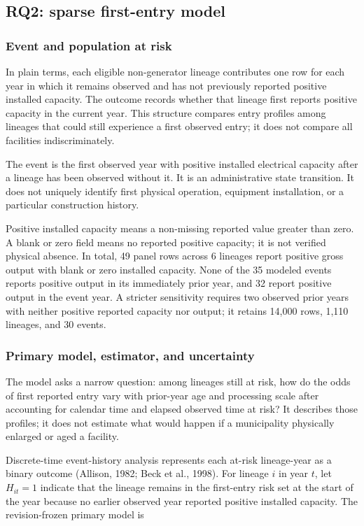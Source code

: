 \documentclass[12pt,a4paper]{article}
\begin{document}
\subsection{RQ2: sparse first-entry model}

\subsubsection{Event and population at risk}

In plain terms, each eligible non-generator lineage contributes one row for
each year in which it remains observed and has not previously reported positive
installed capacity. The outcome records whether that lineage first reports
positive capacity in the current year. This structure compares entry profiles
among lineages that could still experience a first observed entry; it does not
compare all facilities indiscriminately.

The event is the first observed year with positive installed electrical capacity
after a lineage has been observed without it. It is an administrative state
transition. It does not uniquely identify first physical operation, equipment
installation, or a particular construction history.

Positive installed capacity means a non-missing reported value greater than
zero. A blank or zero field means no reported positive capacity; it is not
verified physical absence. In total, 49 panel rows across 6 lineages report
positive gross output with blank or zero installed capacity. None of the 35
modeled events reports positive output in its immediately prior year, and 32
report positive output in the event year. A stricter sensitivity requires two
observed prior years with neither positive reported capacity nor output; it
retains 14,000 rows, 1,110 lineages, and 30 events.

\subsubsection{Primary model, estimator, and uncertainty}

The model asks a narrow question: among lineages still at risk, how do the odds
of first reported entry vary with prior-year age and processing scale after
accounting for calendar time and elapsed observed time at risk? It describes
those profiles; it does not estimate what would happen if a municipality
physically enlarged or aged a facility.

Discrete-time event-history analysis represents each at-risk lineage-year as a
binary outcome (Allison, 1982; Beck et al., 1998). For lineage $i$ in year
$t$, let $H_{it}=1$ indicate that the lineage remains in the first-entry risk
set at the start of the year because no earlier observed year reported positive
installed capacity. The revision-frozen primary model is
\end{document}
